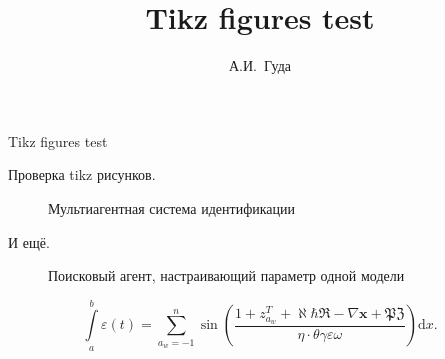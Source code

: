 \documentclass[a4paper,12pt]{article}
\title{Tikz figures test}
\author{А.И.~Гуда}
\begin{document}
\begin{center}
\Large{Tikz figures test}
\end{center}

Проверка tikz рисунков.

\begin{figure}[h!]
\begin{center}

\end{center}
\caption{Мультиагентная система идентификации}
\label{atu:f:f0}
\end{figure}

И ещё.

\begin{figure}[htb!]
\begin{center}

\end{center}
\caption{Поисковый агент, настраивающий параметр одной модели}
\label{atu:f:agent1}
\end{figure}


\[
  \int\limits_{a}^{b} \varepsilon(t)
  =
  \sum\limits_{a_w=-1}^{n} \sin\left(
    \frac{ 1 + z_{a_w}^T + \aleph \hbar \Re - \nabla \mathbf{x} + \mathfrak{PZ} }
         {\eta \cdot \theta \gamma \varepsilon \omega}
  \right) \mathrm{d} x.
\]
\end{document}
